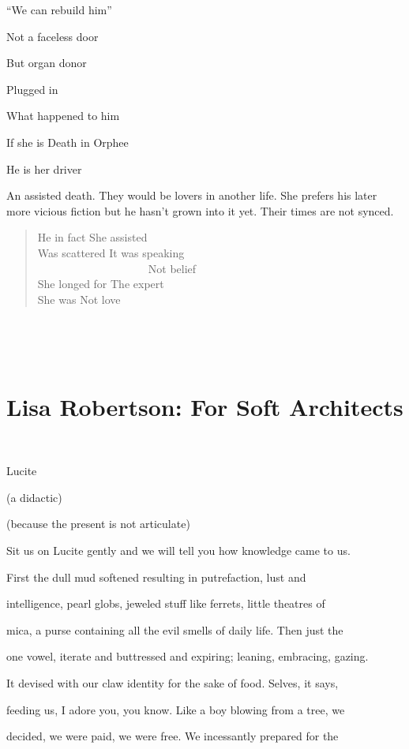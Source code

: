 \documentclass[
]{memoir}
\begin{document}
``We can rebuild him''

Not a faceless door

But organ donor

Plugged in

What happened to him

If she is Death in Orphee

He is her driver

An assisted death. They would be lovers in another life. She prefers his
later more vicious fiction but he hasn't grown into it yet. Their times
are not synced.

\begin{verse}
He in fact She assisted\\
Was scattered It was speaking\\
                    Not belief\\
She longed for The expert\\
She was Not love\\
\end{verse}

~

~

\hypertarget{lisa-robertson-for-soft-architects}{%
\chapter{Lisa Robertson: For Soft
Architects}\label{lisa-robertson-for-soft-architects}}

~

Lucite

(a didactic)

(because the present is not articulate)

Sit us on Lucite gently and we will tell you how knowledge came to us.

First the dull mud softened resulting in putrefaction, lust and

intelligence, pearl globs, jeweled stuff like ferrets, little theatres
of

mica, a purse containing all the evil smells of daily life. Then just
the

one vowel, iterate and buttressed and expiring; leaning, embracing,
gazing.

It devised with our claw identity for the sake of food. Selves, it says,

feeding us, I adore you, you know. Like a boy blowing from a tree, we

decided, we were paid, we were free. We incessantly prepared for the
\end{document}
